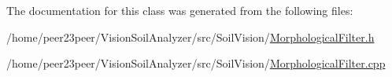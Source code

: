 The documentation for this class was generated from the following files\+:\begin{DoxyCompactItemize}
\item 
/home/peer23peer/\+Vision\+Soil\+Analyzer/src/\+Soil\+Vision/\hyperlink{_morphological_filter_8h}{Morphological\+Filter.\+h}\item 
/home/peer23peer/\+Vision\+Soil\+Analyzer/src/\+Soil\+Vision/\hyperlink{_morphological_filter_8cpp}{Morphological\+Filter.\+cpp}\end{DoxyCompactItemize}
